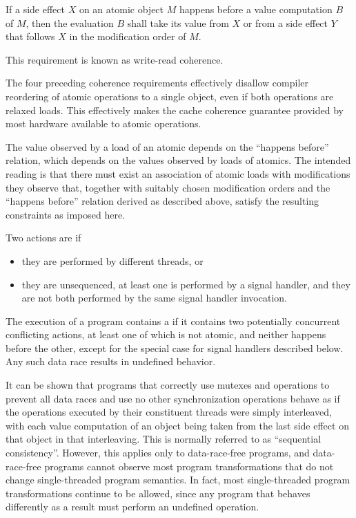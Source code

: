 \pnum
{}%
If a
%
side effect $X$ on an atomic object $M$ happens before a value
computation $B$ of $M$, then the evaluation $B$ shall take its
value from $X$ or from a
%
side effect $Y$ that follows $X$ in the modification order of $M$.
\begin{note}
This requirement is known as write-read coherence.
\end{note}

\pnum
\begin{note}
The four preceding coherence requirements effectively disallow
compiler reordering of atomic operations to a single object, even if both
operations are relaxed loads. This effectively makes the cache coherence
guarantee provided by most hardware available to \Cpp{} atomic operations.
\end{note}

\pnum
\begin{note}
The value observed by a load of an atomic depends on the ``happens
before'' relation, which depends on the values observed by loads of atomics.
The intended reading is that there must exist an
association of atomic loads with modifications they observe that, together with
suitably chosen modification orders and the ``happens before'' relation derived
as described above, satisfy the resulting constraints as imposed here.
\end{note}

\pnum
Two actions are  if
\begin{itemize}
\item they are performed by different threads, or
\item they are unsequenced, at least one is performed by a signal handler, and
they are not both performed by the same signal handler invocation.
\end{itemize}
The execution of a program contains a  if it contains two
potentially concurrent conflicting actions, at least one of which is not atomic,
and neither happens before the other,
except for the special case for signal handlers described below.
Any such data race results in undefined
behavior.
\begin{note}
It can be shown that programs that correctly use mutexes
and  operations to prevent all data races and use no
other synchronization operations behave as if the operations executed by their
constituent threads were simply interleaved, with each
%
value computation of an
object being taken from the last
%
side effect on that object in that
interleaving. This is normally referred to as ``sequential consistency''.
However, this applies only to data-race-free programs, and data-race-free
programs cannot observe most program transformations that do not change
single-threaded program semantics. In fact, most single-threaded program
transformations continue to be allowed, since any program that behaves
differently as a result must perform an undefined operation.
\end{note}

